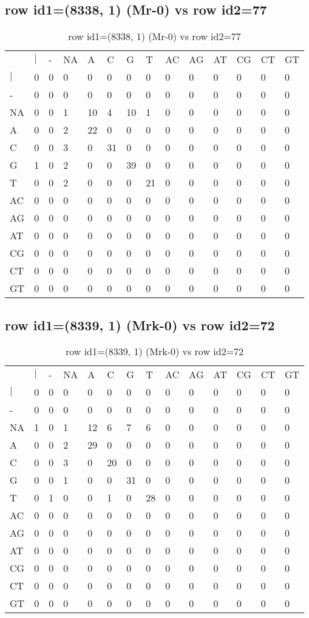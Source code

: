 \subsection{row id1=(8338, 1) (Mr-0) vs row id2=77}
\begin{center}
\begin{longtable}{|l|l|l|l|l|l|l|l|l|l|l|l|l|l|}
\caption{row id1=(8338, 1) (Mr-0) vs row id2=77} \label{table_dm542}\\
\hline
\\
\hline
&$|$&-&NA&A&C&G&T&AC&AG&AT&CG&CT&GT\\
$|$&0&0&0&0&0&0&0&0&0&0&0&0&0\\
-&0&0&0&0&0&0&0&0&0&0&0&0&0\\
NA&0&0&1&10&4&10&1&0&0&0&0&0&0\\
A&0&0&2&22&0&0&0&0&0&0&0&0&0\\
C&0&0&3&0&31&0&0&0&0&0&0&0&0\\
G&1&0&2&0&0&39&0&0&0&0&0&0&0\\
T&0&0&2&0&0&0&21&0&0&0&0&0&0\\
AC&0&0&0&0&0&0&0&0&0&0&0&0&0\\
AG&0&0&0&0&0&0&0&0&0&0&0&0&0\\
AT&0&0&0&0&0&0&0&0&0&0&0&0&0\\
CG&0&0&0&0&0&0&0&0&0&0&0&0&0\\
CT&0&0&0&0&0&0&0&0&0&0&0&0&0\\
GT&0&0&0&0&0&0&0&0&0&0&0&0&0\\
\hline
\end{longtable}
\end{center}

\subsection{row id1=(8339, 1) (Mrk-0) vs row id2=72}
\begin{center}
\begin{longtable}{|l|l|l|l|l|l|l|l|l|l|l|l|l|l|}
\caption{row id1=(8339, 1) (Mrk-0) vs row id2=72} \label{table_dm544}\\
\hline
\\
\hline
&$|$&-&NA&A&C&G&T&AC&AG&AT&CG&CT&GT\\
$|$&0&0&0&0&0&0&0&0&0&0&0&0&0\\
-&0&0&0&0&0&0&0&0&0&0&0&0&0\\
NA&1&0&1&12&6&7&6&0&0&0&0&0&0\\
A&0&0&2&29&0&0&0&0&0&0&0&0&0\\
C&0&0&3&0&20&0&0&0&0&0&0&0&0\\
G&0&0&1&0&0&31&0&0&0&0&0&0&0\\
T&0&1&0&0&1&0&28&0&0&0&0&0&0\\
AC&0&0&0&0&0&0&0&0&0&0&0&0&0\\
AG&0&0&0&0&0&0&0&0&0&0&0&0&0\\
AT&0&0&0&0&0&0&0&0&0&0&0&0&0\\
CG&0&0&0&0&0&0&0&0&0&0&0&0&0\\
CT&0&0&0&0&0&0&0&0&0&0&0&0&0\\
GT&0&0&0&0&0&0&0&0&0&0&0&0&0\\
\hline
\end{longtable}
\end{center}

